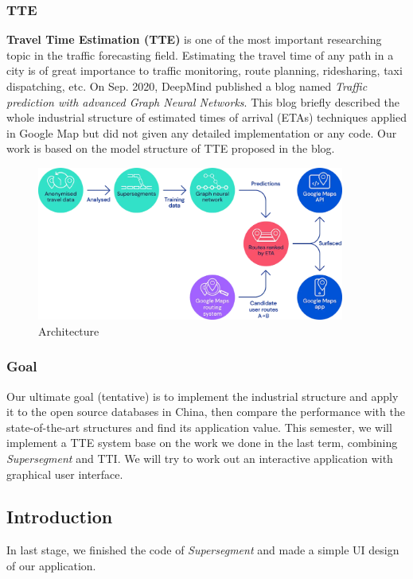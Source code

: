 \documentclass[fontset=none]{ctexart}
\theoremstyle{definition}
\theoremstyle{remark}
\begin{document}
\subsubsection{TTE}
\textbf{Travel Time Estimation (TTE)} is one of the most important researching topic in the traffic forecasting field. 
Estimating the travel time of any path in a city is of great importance to traffic monitoring, route planning, ridesharing, taxi dispatching, etc.
On Sep. 2020, DeepMind published a blog named \textit{Traffic prediction with advanced Graph Neural Networks}. 
This blog briefly described the whole industrial structure of estimated times of arrival (ETAs) techniques applied in Google Map but did not given any detailed implementation or any code.
Our work is based on the model structure of TTE proposed in the blog.
\begin{figure}[htb]
    \centering
    \includegraphics[width=0.9\textwidth]{images/architecture.png}
    \caption{Architecture}
    \label{fig1}
\end{figure}

\subsubsection{Goal}
Our ultimate goal (tentative) is to implement the industrial structure and apply it to the open source databases in China, then compare the performance with the state-of-the-art structures and find its application value.
This semester, we will implement a TTE system base on the work we done in the last term, combining \textit{Supersegment} and TTI.
We will try to work out an interactive application with graphical user interface. 

\subsection{Introduction}
In last stage, we finished the code of \textit{Supersegment} and made a simple UI design of our application.
\end{document}
